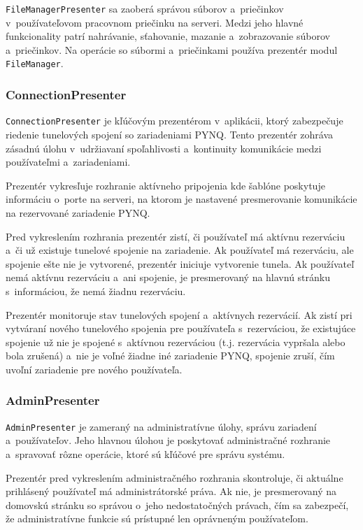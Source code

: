\verb|FileManagerPresenter| sa zaoberá správou súborov a~priečinkov v~používateľovom pracovnom priečinku na serveri. Medzi jeho hlavné funkcionality patrí nahrávanie, sťahovanie, mazanie a~zobrazovanie súborov a~priečinkov. Na operácie so súbormi a~priečinkami používa prezentér modul \verb|FileManager|. 

\subsubsection*{ConnectionPresenter}

\verb|ConnectionPresenter| je kľúčovým prezentérom v~aplikácii, ktorý zabezpečuje riedenie tunelových spojení so zariadeniami PYNQ. Tento prezentér zohráva zásadnú úlohu v~udržiavaní spoľahlivosti a~kontinuity komunikácie medzi používateľmi a~zariadeniami. 

Prezentér vykresľuje rozhranie aktívneho pripojenia kde šablóne poskytuje informáciu o~porte na serveri, na ktorom je nastavené presmerovanie komunikácie na rezervované zariadenie PYNQ.

Pred vykreslením rozhrania prezentér zistí, či používateľ má aktívnu rezerváciu a~či už existuje tunelové spojenie na zariadenie. Ak používateľ má rezerváciu, ale spojenie ešte nie je vytvorené, prezentér iniciuje vytvorenie tunela. Ak používateľ nemá aktívnu rezerváciu a~ani spojenie, je presmerovaný na hlavnú stránku s~informáciou, že nemá žiadnu rezerváciu. 

Prezentér monitoruje stav tunelových spojení a~aktívnych rezervácií. Ak zistí pri vytváraní nového tunelového spojenia pre používateľa s~rezerváciou, že existujúce spojenie už nie je spojené s~aktívnou rezerváciou (t.j. rezervácia vypršala alebo bola zrušená) a~nie je voľné žiadne iné zariadenie PYNQ, spojenie zruší, čím uvoľní zariadenie pre nového používateľa. 

\subsubsection*{AdminPresenter}

\verb|AdminPresenter| je zameraný na administratívne úlohy, správu zariadení a~používateľov. Jeho hlavnou úlohou je poskytovať administračné rozhranie a~spravovať rôzne operácie, ktoré sú kľúčové pre správu systému.

Prezentér pred vykreslením administračného rozhrania skontroluje, či aktuálne prihlásený používateľ má administrátorské práva. Ak nie, je presmerovaný na domovskú stránku so správou o~jeho nedostatočných právach, čím sa zabezpečí, že administratívne funkcie sú prístupné len oprávneným používateľom.

